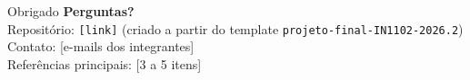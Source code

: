 \documentclass[aspectratio=169,11pt]{beamer}
\begin{document}
\begin{frame}{Obrigado}
    \centering
    \textbf{Perguntas?}
    \\[1em]
    \footnotesize
    Repositório: \texttt{[link]} (criado a partir do template \texttt{projeto-final-IN1102-2026.2})\\
    Contato: [e-mails dos integrantes]\\
    Referências principais: [3 a 5 itens]
\end{frame}
\end{document}
